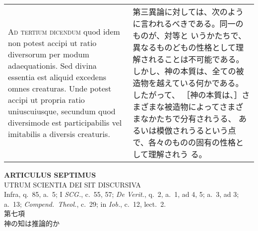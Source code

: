\documentclass[10pt]{jsarticle} %
\begin{document}
\begin{longtable}{p{21em}p{21em}}
\\


{\scshape Ad tertium dicendum} quod idem non potest accipi ut ratio
diversorum per modum adaequationis. Sed divina essentia est aliquid
excedens omnes creaturas. Unde potest accipi ut propria ratio
uniuscuiusque, secundum quod diversimode est participabilis vel
imitabilis a diversis creaturis.

&

第三異論に対しては、次のように言われるべきである。同一のものが、対等と
いうかたちで、異なるものどもの性格として理解されることは不可能である。
しかし、神の本質は、全ての被造物を越えている何かである。したがって、
［神の本質は、］さまざまな被造物によってさまざまなかたちで分有されうる、
あるいは模倣されうるという点で、各々のものの固有の性格として理解されう
る。

\\

\end{longtable}
\newpage





\begin{center}
{\Large {\bf ARTICULUS SEPTIMUS}}\\ {\large UTRUM SCIENTIA DEI SIT
DISCURSIVA}\\ {\footnotesize Infra, q.~85, a.~5; I {\itshape SCG.},
c.~55, 57; {\itshape De Verit.}, q.~2, a.~1, ad 4, 5; a.~3, ad 3;
a.~13; {\itshape Compend.~Theol.}, c.~29; in {\itshape Iob.}, c.~12,
lect.~2.}\\ {\Large 第七項\\神の知は推論的か}
\end{center}
\end{document}

